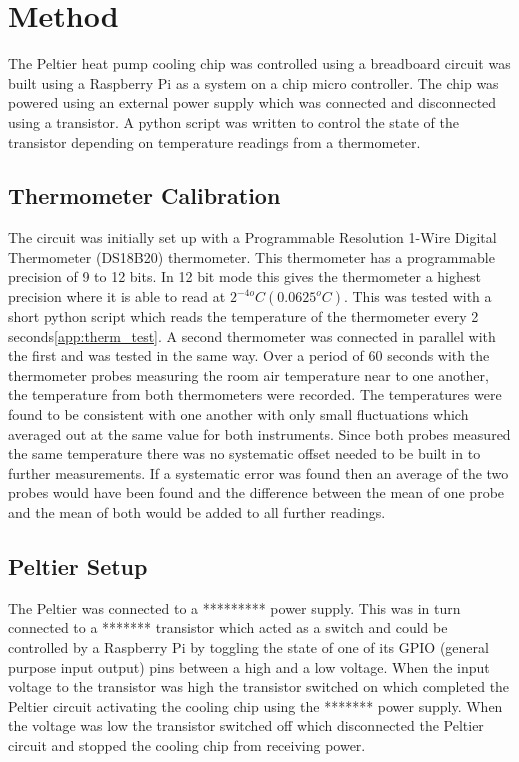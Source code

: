 \documentclass[10pt]{article}
\begin{document}
\section*{Method}
The Peltier heat pump cooling chip was controlled using a breadboard circuit was built using a Raspberry Pi\cite{rpi} as a system on a chip micro controller. The chip was powered using an external power supply which was connected and disconnected using a transistor. A python script was written to control the state of the transistor depending on temperature readings from a thermometer. \\

\subsection*{Thermometer Calibration}

The circuit was initially set up with a Programmable Resolution 1-Wire Digital Thermometer (DS18B20) thermometer\cite{thermometer}. This thermometer has a programmable precision of 9 to 12 bits. In 12 bit mode this gives the thermometer a highest precision where it is able to read at $2^{-4o} C (0.0625^o C)$. This was tested with a short python script which reads the temperature of the thermometer every 2 seconds\ref{app:therm_test}. A second thermometer was connected in parallel with the first and was tested in the same way. Over a period of 60 seconds with the thermometer probes measuring the room air temperature near to one another, the temperature from both thermometers were recorded. The temperatures were found to be consistent with one another with only small fluctuations which averaged out at the same value for both instruments. Since both probes measured the same temperature there was no systematic offset needed to be built in to further measurements. If a systematic error was found then an average of the two probes would have been found and the difference between the mean of one probe and the mean of both would be added to all further readings.\\

\subsection*{Peltier Setup}
The Peltier was connected to a ********* power supply. This was in turn connected to a ******* transistor which acted as a switch and could be controlled by a Raspberry Pi by toggling the state of one of its GPIO (general purpose input output) pins between a high and a low voltage. When the input voltage to the transistor was high the transistor switched on which completed the Peltier circuit activating the cooling chip using the ******* power supply. When the voltage was low the transistor switched off which disconnected the Peltier circuit and stopped the cooling chip from receiving power.\\
\end{document}
